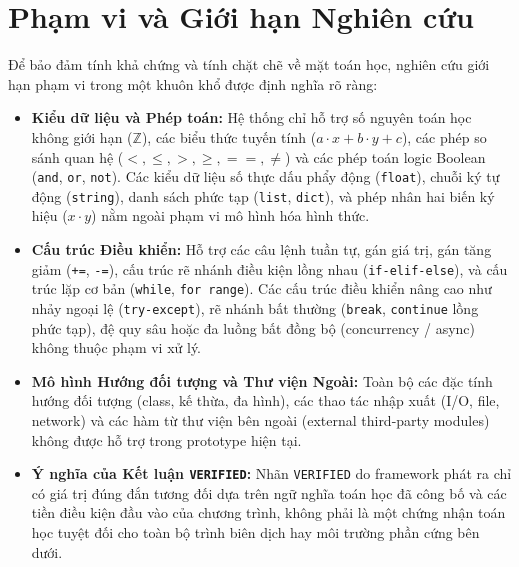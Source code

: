 \section{Phạm vi và Giới hạn Nghiên cứu}
\label{sec:scope_and_limitations}
Để bảo đảm tính khả chứng và tính chặt chẽ về mặt toán học, nghiên cứu giới hạn phạm vi trong một khuôn khổ được định nghĩa rõ ràng:
\begin{itemize}
    \item \textbf{Kiểu dữ liệu và Phép toán:} Hệ thống chỉ hỗ trợ số nguyên toán học không giới hạn ($\mathbb{Z}$), các biểu thức tuyến tính ($a \cdot x + b \cdot y + c$), các phép so sánh quan hệ ($<, \le, >, \ge, ==, \ne$) và các phép toán logic Boolean (\texttt{and}, \texttt{or}, \texttt{not}). Các kiểu dữ liệu số thực dấu phẩy động (\texttt{float}), chuỗi ký tự động (\texttt{string}), danh sách phức tạp (\texttt{list}, \texttt{dict}), và phép nhân hai biến ký hiệu ($x \cdot y$) nằm ngoài phạm vi mô hình hóa hình thức.
    \item \textbf{Cấu trúc Điều khiển:} Hỗ trợ các câu lệnh tuần tự, gán giá trị, gán tăng giảm (\texttt{+=}, \texttt{-=}), cấu trúc rẽ nhánh điều kiện lồng nhau (\texttt{if-elif-else}), và cấu trúc lặp cơ bản (\texttt{while}, \texttt{for range}). Các cấu trúc điều khiển nâng cao như nhảy ngoại lệ (\texttt{try-except}), rẽ nhánh bất thường (\texttt{break}, \texttt{continue} lồng phức tạp), đệ quy sâu hoặc đa luồng bất đồng bộ (concurrency / async) không thuộc phạm vi xử lý.
    \item \textbf{Mô hình Hướng đối tượng và Thư viện Ngoài:} Toàn bộ các đặc tính hướng đối tượng (class, kế thừa, đa hình), các thao tác nhập xuất (I/O, file, network) và các hàm từ thư viện bên ngoài (external third-party modules) không được hỗ trợ trong prototype hiện tại.
    \item \textbf{Ý nghĩa của Kết luận \texttt{VERIFIED}:} Nhãn \texttt{VERIFIED} do framework phát ra chỉ có giá trị đúng đắn tương đối dựa trên ngữ nghĩa toán học đã công bố và các tiền điều kiện đầu vào của chương trình, không phải là một chứng nhận toán học tuyệt đối cho toàn bộ trình biên dịch hay môi trường phần cứng bên dưới.
\end{itemize}

